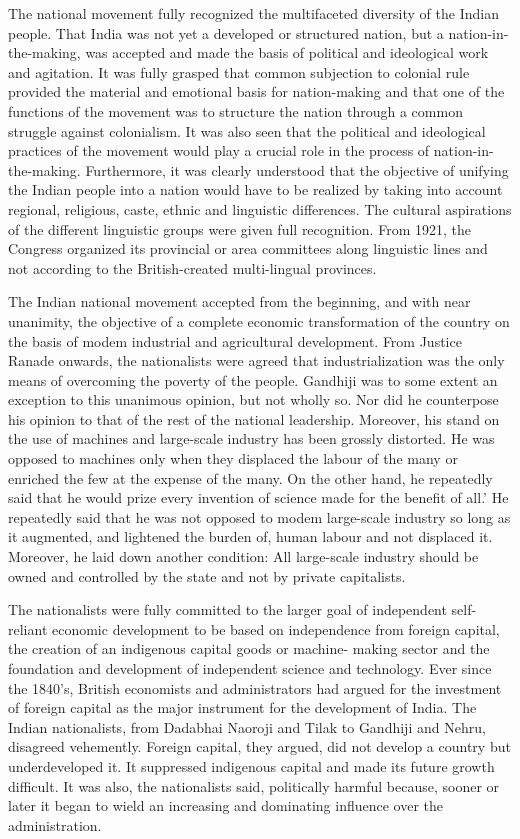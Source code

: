 \begin{multicols}{2}
The national movement fully recognized the multifaceted diversity of the Indian people. That India was not yet a developed or structured nation, but a nation-in-the-making, was accepted and made the basis of political and ideological work and agitation. It was fully grasped that common subjection to colonial rule provided the material and emotional basis for nation-making and that one of the functions of the movement was to structure the nation through a common struggle against colonialism. It was also seen that the political and ideological practices of the movement would play a crucial role in the process of nation-in-the-making. Furthermore, it was clearly understood that the objective of unifying the Indian people into a nation would have to be realized by taking into account regional, religious, caste, ethnic and linguistic differences. The cultural aspirations of the different linguistic groups were given full recognition. From 1921, the Congress organized its provincial or area committees along linguistic lines and not according to the British-created multi-lingual provinces.

The Indian national movement accepted from the beginning, and with near unanimity, the objective of a complete economic transformation of the country on the basis of modem industrial and agricultural development. From Justice Ranade onwards, the nationalists were agreed that industrialization was the only means of overcoming the poverty of the people. Gandhiji was to some extent an exception to this unanimous opinion, but not wholly so. Nor did he counterpose his opinion to that of the rest of the national leadership. Moreover, his stand on the use of machines and large-scale industry has been grossly distorted. He was opposed to machines only when they displaced the labour of the many or enriched the few at the expense of the many. On the other hand, he repeatedly said that he would prize every invention of science made for the benefit of all.' He repeatedly said that he was not opposed to modem large-scale industry so long as it augmented, and lightened the burden of, human labour and not displaced it. Moreover, he laid down another condition: All large-scale industry should be owned and controlled by the state and not by private capitalists.

The nationalists were fully committed to the larger goal of independent self-reliant economic development to be based on independence from foreign capital, the creation of an indigenous capital goods or machine- making sector and the foundation and development of independent science and technology. Ever since the 1840's, British economists and administrators had argued for the investment of foreign capital as the major instrument for the development of India. The Indian nationalists, from Dadabhai Naoroji and Tilak to Gandhiji and Nehru, disagreed vehemently. Foreign capital, they argued, did not develop a country but underdeveloped it. It suppressed indigenous capital and made its future growth difficult. It was also, the nationalists said, politically harmful because, sooner or later it began to wield an increasing and dominating influence over the administration.


\end{multicols}
